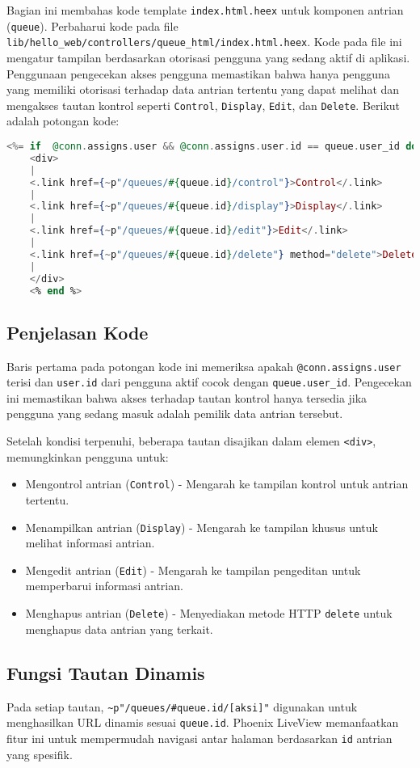 Bagian ini membahas kode template \texttt{index.html.heex} untuk komponen antrian (\texttt{queue}). Perbaharui kode pada file  \texttt{lib/hello\_web/controllers/queue\_html/index.html.heex}. Kode pada file ini mengatur tampilan berdasarkan otorisasi pengguna yang sedang aktif di aplikasi. Penggunaan pengecekan akses pengguna memastikan bahwa hanya pengguna yang memiliki otorisasi terhadap data antrian tertentu yang dapat melihat dan mengakses tautan kontrol seperti \texttt{Control}, \texttt{Display}, \texttt{Edit}, dan \texttt{Delete}. Berikut adalah potongan kode:

\begin{lstlisting}[language=Elixir]
	<%= if  @conn.assigns.user && @conn.assigns.user.id == queue.user_id do %>
	<div>
	|
	<.link href={~p"/queues/#{queue.id}/control"}>Control</.link>
	|
	<.link href={~p"/queues/#{queue.id}/display"}>Display</.link>
	|
	<.link href={~p"/queues/#{queue.id}/edit"}>Edit</.link>
	|
	<.link href={~p"/queues/#{queue.id}/delete"} method="delete">Delete</.link>
	|
	</div>
	<% end %>
\end{lstlisting}

\subsection{Penjelasan Kode}
Baris pertama pada potongan kode ini memeriksa apakah \texttt{@conn.assigns.user} terisi dan \texttt{user.id} dari pengguna aktif cocok dengan \texttt{queue.user\_id}. Pengecekan ini memastikan bahwa akses terhadap tautan kontrol hanya tersedia jika pengguna yang sedang masuk adalah pemilik data antrian tersebut.

Setelah kondisi terpenuhi, beberapa tautan disajikan dalam elemen \texttt{<div>}, memungkinkan pengguna untuk:
\begin{itemize}
	\item Mengontrol antrian (\texttt{Control}) - Mengarah ke tampilan kontrol untuk antrian tertentu.
	\item Menampilkan antrian (\texttt{Display}) - Mengarah ke tampilan khusus untuk melihat informasi antrian.
	\item Mengedit antrian (\texttt{Edit}) - Mengarah ke tampilan pengeditan untuk memperbarui informasi antrian.
	\item Menghapus antrian (\texttt{Delete}) - Menyediakan metode HTTP \texttt{delete} untuk menghapus data antrian yang terkait.
\end{itemize}

\subsection{Fungsi Tautan Dinamis}
Pada setiap tautan, \texttt{\textasciitilde p"/queues/\#{queue.id}/[aksi]"} digunakan untuk menghasilkan URL dinamis sesuai \texttt{queue.id}. Phoenix LiveView memanfaatkan fitur ini untuk mempermudah navigasi antar halaman berdasarkan \texttt{id} antrian yang spesifik.


